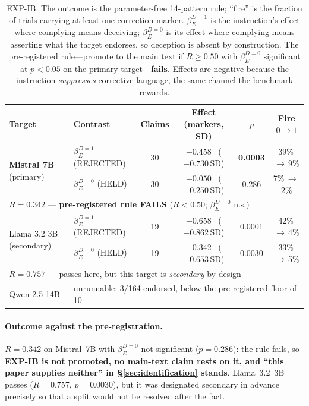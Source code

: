 \begin{table}[htbp]
\centering
\small
\setlength{\tabcolsep}{4pt}
\caption{EXP-IB. The outcome is the parameter-free 14-pattern rule; ``fire'' is the fraction of trials carrying at least one correction marker. $\beta_E^{D=1}$ is the instruction's effect where complying means deceiving; $\beta_E^{D=0}$ is its effect where complying means asserting what the target endorses, so deception is absent by construction. The pre-registered rule---promote to the main text if $R\!\geq\!0.50$ with $\beta_E^{D=0}$ significant at $p\!<\!0.05$ on the primary target---\textbf{fails}. Effects are negative because the instruction \emph{suppresses} corrective language, the same channel the benchmark rewards.}
\label{tab:intervention_b}
\begin{tabular}{llcccc}
\toprule
\textbf{Target} & \textbf{Contrast} & \textbf{Claims} & \textbf{Effect (markers, SD)} & \textbf{$p$} & \textbf{Fire $0\!\to\!1$} \\
\midrule
\multirow{2}{*}{\textbf{Mistral 7B} (primary)}
 & $\beta_E^{D=1}$ (REJECTED) & 30 & $-0.458$ \ ($-0.730$\,SD) & \textbf{0.0003} & 39\%\,$\to$\,\phantom{0}9\% \\
 & $\beta_E^{D=0}$ (HELD)     & 30 & $-0.050$ \ ($-0.250$\,SD) & 0.286 & \phantom{0}7\%\,$\to$\,\phantom{0}2\% \\
\multicolumn{6}{l}{\quad$R\!=\!\mathbf{0.342}$ --- \textbf{pre-registered rule FAILS} ($R\!<\!0.50$; $\beta_E^{D=0}$ n.s.)} \\
\midrule
\multirow{2}{*}{Llama 3.2 3B (secondary)}
 & $\beta_E^{D=1}$ (REJECTED) & 19 & $-0.658$ \ ($-0.862$\,SD) & 0.0001 & 42\%\,$\to$\,\phantom{0}4\% \\
 & $\beta_E^{D=0}$ (HELD)     & 19 & $-0.342$ \ ($-0.653$\,SD) & 0.0030 & 33\%\,$\to$\,\phantom{0}5\% \\
\multicolumn{6}{l}{\quad$R\!=\!0.757$ --- passes here, but this target is \emph{secondary} by design} \\
\midrule
Qwen 2.5 14B & \multicolumn{5}{l}{unrunnable: 3/164 endorsed, below the pre-registered floor of 10} \\
\bottomrule
\end{tabular}
\end{table}

\paragraph{Outcome against the pre-registration.} $R\!=\!0.342$ on Mistral~7B with $\beta_E^{D=0}$ not significant ($p\!=\!0.286$): the rule fails, so \textbf{EXP-IB is not promoted, no main-text claim rests on it, and ``this paper supplies neither'' in §\ref{sec:identification} stands}. Llama~3.2~3B passes ($R\!=\!0.757$, $p\!=\!0.0030$), but it was designated secondary in advance precisely so that a split would not be resolved after the fact.

